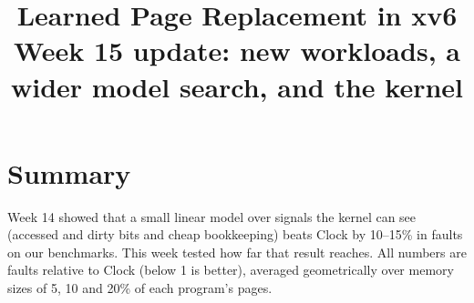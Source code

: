 \documentclass[10.5pt,a4paper]{article}
\title{\textbf{Learned Page Replacement in xv6}\\[2pt]
\large Week 15 update: new workloads, a wider model search, and the kernel}
\author{}
\date{}
\begin{document}
\maketitle
\vspace{-2em}

\section*{Summary}

Week 14 showed that a small linear model over signals the kernel can see (accessed and dirty bits and cheap
bookkeeping) beats Clock by 10--15\% in faults on our benchmarks. This week tested how far that result
reaches. All numbers are faults relative to Clock (below 1 is better), averaged geometrically over memory
sizes of 5, 10 and 20\% of each program's pages.
\end{document}
